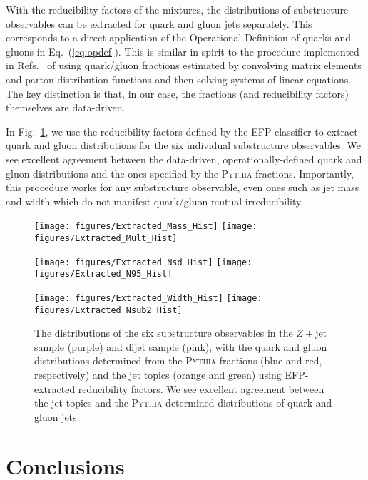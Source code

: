 \documentclass[letterpaper,11pt]{article}
\DeclareRobustCommand{\Fig}[1]{Fig.~\ref{#1}}
\DeclareRobustCommand{\Eq}[1]{Eq.~(\ref{#1})}
\DeclareRobustCommand{\Refs}[1]{Refs.~\cite{#1}}
\newcommand{\pythia}{\textsc{Pythia}\xspace}
\begin{document}
With the reducibility factors of the mixtures, the distributions of substructure observables can be extracted for quark and gluon jets separately.
%
This corresponds to a direct application of the Operational Definition of quarks and gluons in \Eq{eq:opdef}.
%
This is similar in spirit to the procedure implemented in \Refs{Aad:2014gea,ATL-PHYS-PUB-2017-009} of using quark/gluon fractions estimated by convolving matrix elements and parton distribution functions and then solving systems of linear equations.
%
The key distinction is that, in our case, the fractions (and reducibility factors) themselves are data-driven.

In \Fig{fig:extractedhists}, we use the reducibility factors defined by the EFP classifier to extract quark and gluon distributions for the six individual substructure observables. 
%
We see excellent agreement between the data-driven, operationally-defined quark and gluon distributions and the ones specified by the \pythia fractions.
%
Importantly, this procedure works for any substructure observable, even ones such as jet mass and width which do not manifest quark/gluon mutual irreducibility.


\begin{figure}[t]
\centering
\texttt{[image: figures/Extracted\_Mass\_Hist]}
\texttt{[image: figures/Extracted\_Mult\_Hist]}

\texttt{[image: figures/Extracted\_Nsd\_Hist]}
\texttt{[image: figures/Extracted\_N95\_Hist]}

\texttt{[image: figures/Extracted\_Width\_Hist]}
\texttt{[image: figures/Extracted\_Nsub2\_Hist]}
\caption{
%
The distributions of the six substructure observables in the $Z+$jet sample (purple) and dijet sample (pink), with the quark and gluon distributions determined from the \pythia fractions (blue and red, respectively) and the jet topics (orange and green) using EFP-extracted reducibility factors.
%
We see excellent agreement between the jet topics and the \pythia-determined distributions of quark and gluon jets.
}
\label{fig:extractedhists}
\end{figure}
\afterpage{\clearpage}



\section{Conclusions}
\label{sec:conc}
\end{document}
